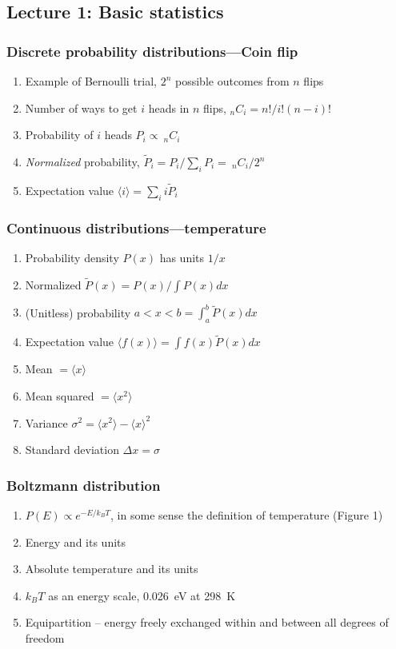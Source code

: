 \documentclass[11pt]{article}
\begin{document}
\subsection{Lecture 1: Basic statistics}
\label{sec:org352c5f9}
\subsubsection{Discrete probability distributions---Coin flip}
\label{sec:org9a109ed}
\begin{enumerate}
\item Example of Bernoulli trial, \(2^n\) possible outcomes from \(n\) flips
\item Number of ways to get \(i\) heads in \(n\) flips, \(_nC_i=n!/i!(n-i)!\)
\item Probability of \(i\) heads \(P_i \propto\ _nC_i\)
\item \emph{Normalized} probability, \(\tilde P_i = P_i/\sum_i P_i =\ _nC_i/2^n\)
\item Expectation value \(\langle i \rangle = \sum_i i \tilde P_i\)
\end{enumerate}

\subsubsection{Continuous distributions---temperature}
\label{sec:org2afcc85}
\begin{enumerate}
\item Probability density \(P(x)\) has units \(1/x\)
\item Normalized \(\tilde P(x) = P(x)/\int P(x) dx\)
\item (Unitless) probability \(a < x < b = \int_a^b \tilde P(x) dx\)
\item Expectation value \(\langle f(x) \rangle = \int f(x) \tilde P(x) dx\)
\item Mean \(= \langle x \rangle\)
\item Mean squared \(= \langle x^2 \rangle\)
\item Variance \(\sigma^2=\langle x^2 \rangle - \langle x \rangle^2\)
\item Standard deviation \(\Delta x = \sigma\)
\end{enumerate}

\subsubsection{Boltzmann distribution}
\label{sec:orgd0a5bb8}
\begin{enumerate}
\item \(P(E) \propto e^{-E/k_BT}\), in some sense the definition of temperature (Figure 1)
\item Energy and its units
\item Absolute temperature and its units
\item \(k_BT\) as an energy scale, \SI{0.026}{eV} at \SI{298}{K}
\item Equipartition -- energy freely exchanged within and between all degrees of freedom
\end{enumerate}
\end{document}
